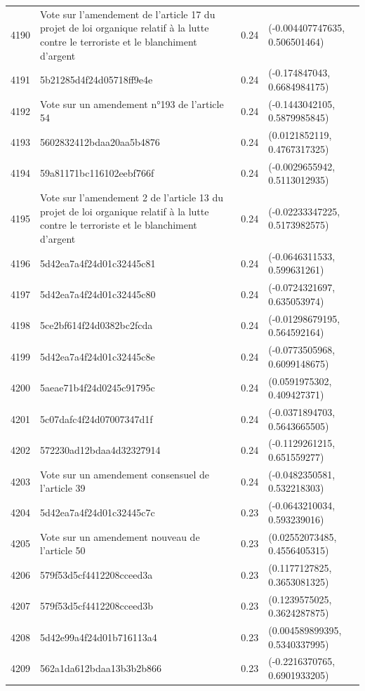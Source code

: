 \begin{table}[ht]
\begin{tabular}{rlrl}
  4190 & Vote sur l'amendement de l'article 17 du projet de loi organique relatif à la lutte contre le terroriste et le blanchiment d'argent & 0.24 & (-0.004407747635, 0.506501464) \\ 
  4191 & 5b21285d4f24d05718ff9e4e & 0.24 & (-0.174847043, 0.6684984175) \\ 
  4192 & Vote sur un amendement n°193 de l'article 54 & 0.24 & (-0.1443042105, 0.5879985845) \\ 
  4193 & 5602832412bdaa20aa5b4876 & 0.24 & (0.0121852119, 0.4767317325) \\ 
  4194 & 59a81171bc116102eebf766f & 0.24 & (-0.0029655942, 0.5113012935) \\ 
  4195 & Vote sur l'amendement 2 de l'article 13 du projet de loi organique relatif à la lutte contre le terroriste et le blanchiment d'argent & 0.24 & (-0.02233347225, 0.5173982575) \\ 
  4196 & 5d42ea7a4f24d01c32445c81 & 0.24 & (-0.0646311533, 0.599631261) \\ 
  4197 & 5d42ea7a4f24d01c32445c80 & 0.24 & (-0.0724321697, 0.635053974) \\ 
  4198 & 5ce2bf614f24d0382bc2fcda & 0.24 & (-0.01298679195, 0.564592164) \\ 
  4199 & 5d42ea7a4f24d01c32445c8e & 0.24 & (-0.0773505968, 0.6099148675) \\ 
  4200 & 5aeae71b4f24d0245c91795c & 0.24 & (0.0591975302, 0.409427371) \\ 
  4201 & 5c07dafc4f24d07007347d1f & 0.24 & (-0.0371894703, 0.5643665505) \\ 
  4202 & 572230ad12bdaa4d32327914 & 0.24 & (-0.1129261215, 0.651559277) \\ 
  4203 & Vote sur un amendement consensuel de l'article 39 & 0.24 & (-0.0482350581, 0.532218303) \\ 
  4204 & 5d42ea7a4f24d01c32445c7c & 0.23 & (-0.0643210034, 0.593239016) \\ 
  4205 & Vote sur un amendement nouveau de l'article 50 & 0.23 & (0.02552073485, 0.4556405315) \\ 
  4206 & 579f53d5cf4412208cceed3a & 0.23 & (0.1177127825, 0.3653081325) \\ 
  4207 & 579f53d5cf4412208cceed3b & 0.23 & (0.1239575025, 0.3624287875) \\ 
  4208 & 5d42e99a4f24d01b716113a4 & 0.23 & (0.004589899395, 0.5340337995) \\ 
  4209 & 562a1da612bdaa13b3b2b866 & 0.23 & (-0.2216370765, 0.6901933205) \\ 

\end{tabular}
\end{table}
